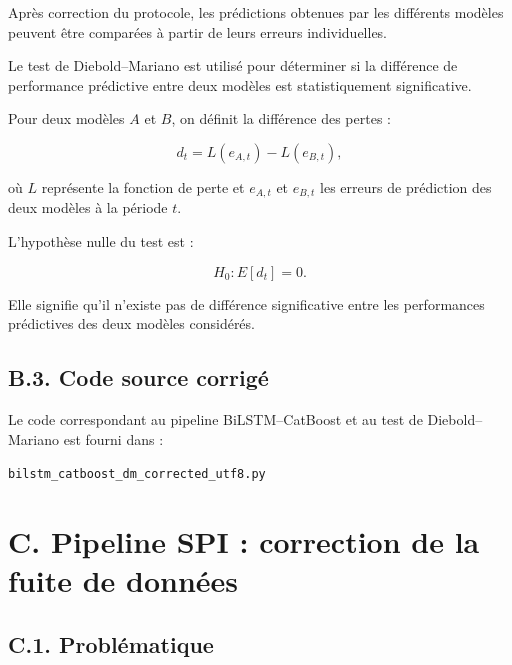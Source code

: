 \documentclass[12pt, a4paper, oneside, french]{report}
\begin{document}
Après correction du protocole, les prédictions obtenues par les différents
modèles peuvent être comparées à partir de leurs erreurs individuelles.

Le test de Diebold--Mariano est utilisé pour déterminer si la différence de
performance prédictive entre deux modèles est statistiquement significative.

Pour deux modèles $A$ et $B$, on définit la différence des pertes :

\begin{equation}
d_t = L(e_{A,t}) - L(e_{B,t}),
\end{equation}

où $L$ représente la fonction de perte et $e_{A,t}$ et $e_{B,t}$ les erreurs
de prédiction des deux modèles à la période $t$.

L'hypothèse nulle du test est :

\begin{equation}
H_0 : E[d_t] = 0.
\end{equation}

Elle signifie qu'il n'existe pas de différence significative entre les
performances prédictives des deux modèles considérés.

\subsection*{B.3. Code source corrigé}

Le code correspondant au pipeline BiLSTM--CatBoost et au test de
Diebold--Mariano est fourni dans :

\begin{center}
\texttt{bilstm\_catboost\_dm\_corrected\_utf8.py}
\end{center}




\section*{C. Pipeline SPI : correction de la fuite de données}

\subsection*{C.1. Problématique}
\end{document}
